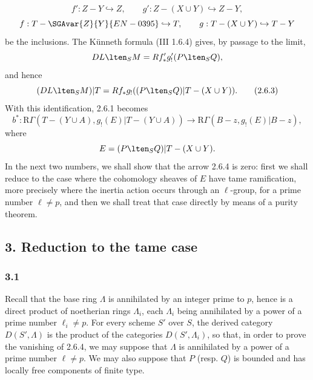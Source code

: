 \[
f':Z-Y\hookrightarrow Z,\qquad
g':Z-(X\cup Y)\hookrightarrow Z-Y,
\]
\[
f:T-\SGAvar{Z}{Y}{EN-0395}\hookrightarrow T,\qquad
g:T-(X\cup Y)\hookrightarrow T-Y
\]
be the inclusions. The Künneth formula (III 1.6.4) gives, by passage to the limit,
\[
DL\lten_SM=Rf'_*g'_!(P\lten_SQ),
\]
and hence
\begin{equation}
(DL\lten_SM)|T=Rf_*g_!((P\lten_SQ)|T-(X\cup Y)).
\tag{2.6.3}
\end{equation}
With this identification, 2.6.1 becomes
\begin{equation}
b^*:\mathrm R\Gamma(T-(Y\cup A),g_!(E)|T-(Y\cup A))
 \longrightarrow \mathrm R\Gamma(B-z,g_!(E)|B-z),
\tag{2.6.4}
\end{equation}
where
\[
E=(P\lten_SQ)|T-(X\cup Y).
\]
In the next two numbers, we shall show that the arrow 2.6.4 is zero: first we shall reduce to the case where the cohomology sheaves of $E$ have tame ramification, more precisely where the inertia action occurs through an $\ell$-group, for a prime number $\ell\ne p$, and then we shall treat that case directly by means of a purity theorem.

\subsection*{3. Reduction to the tame case}

\subsubsection*{3.1}
Recall that the base ring $\Lambda$ is annihilated by an integer prime to $p$, hence is a direct product of noetherian rings $\Lambda_i$, each $\Lambda_i$ being annihilated by a power of a prime number $\ell_i\ne p$. For every scheme $S'$ over $S$, the derived category $D(S',\Lambda)$ is the product of the categories $D(S',\Lambda_i)$, so that, in order to prove the vanishing of 2.6.4, we may suppose that $\Lambda$ is annihilated by a power of a prime number $\ell\ne p$. We may also suppose that $P$ (resp. $Q$) is bounded and has locally free components of finite type.

